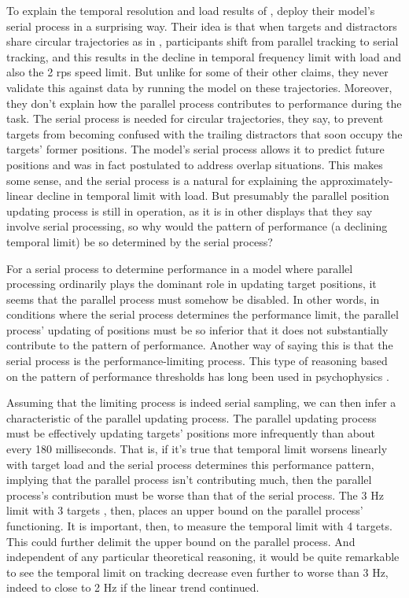 \documentclass[
]{book}
\begin{document}
To explain the temporal resolution and load results of \citet{holcombeSplittingAttentionReduces2013}, \citet{lovettSelectionEnablesEnhancement2019} deploy their model's serial process in a surprising way. Their idea is that when targets and distractors share circular trajectories as in \citet{holcombeSplittingAttentionReduces2013}, participants shift from parallel tracking to serial tracking, and this results in the decline in temporal frequency limit with load and also the 2 rps speed limit. But unlike for some of their other claims, they never validate this against data by running the model on these trajectories. Moreover, they don't explain how the parallel process contributes to performance during the task. The serial process is needed for circular trajectories, they say, to prevent targets from becoming confused with the trailing distractors that soon occupy the targets' former positions. The model's serial process allows it to predict future positions and was in fact postulated to address overlap situations. This makes some sense, and the serial process is a natural for explaining the approximately-linear decline in temporal limit with load. But presumably the parallel position updating process is still in operation, as it is in other displays that they say involve serial processing, so why would the pattern of performance (a declining temporal limit) be so determined by the serial process?

For a serial process to determine performance in a model where parallel processing ordinarily plays the dominant role in updating target positions, it seems that the parallel process must somehow be disabled. In other words, in conditions where the serial process determines the performance limit, the parallel process' updating of positions must be so inferior that it does not substantially contribute to the pattern of performance. Another way of saying this is that the serial process is the performance-limiting process. This type of reasoning based on the pattern of performance thresholds has long been used in psychophysics \citep[e.g.,][]{victorTemporalPhaseDiscrimination2002}.

Assuming that the limiting process is indeed serial sampling, we can then infer a characteristic of the parallel updating process. The parallel updating process must be effectively updating targets' positions more infrequently than about every 180 milliseconds. That is, if it's true that temporal limit worsens linearly with target load and the serial process determines this performance pattern, implying that the parallel process isn't contributing much, then the parallel process's contribution must be worse than that of the serial process. The 3 Hz limit with 3 targets \citep{holcombeSplittingAttentionReduces2013, roudaiaDifferentEffectsAging2017}, then, places an upper bound on the parallel process' functioning. It is important, then, to measure the temporal limit with 4 targets. This could further delimit the upper bound on the parallel process. And independent of any particular theoretical reasoning, it would be quite remarkable to see the temporal limit on tracking decrease even further to worse than 3 Hz, indeed to close to 2 Hz if the linear trend continued.
\end{document}
